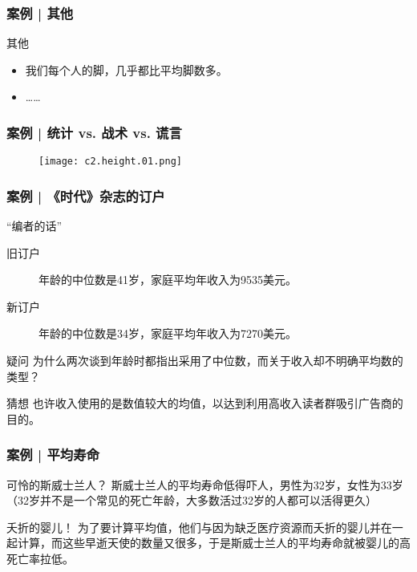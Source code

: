 \begin{frame}
  \frametitle{案例 | 其他}
  \begin{block}{其他}
    \begin{itemize}
      \item 我们每个人的脚，几乎都比平均脚数多。
      \item ……
    \end{itemize}
  \end{block}
\end{frame}

\begin{frame}
  \frametitle{案例 | 统计 vs. 战术 vs. 谎言}
  \begin{figure}
    \centering
    \texttt{[image: c2.height.01.png]}
  \end{figure}
\end{frame}

\begin{frame}
  \frametitle{案例 | 《时代》杂志的订户}
  \begin{block}{“编者的话”}
    \begin{description}
      \item[旧订户] 年龄的中位数是41岁，家庭平均年收入为9535美元。
      \item[新订户] 年龄的中位数是34岁，家庭平均年收入为7270美元。
    \end{description}
  \end{block}
  \pause
  \begin{block}{疑问}
    为什么两次谈到年龄时都指出采用了中位数，而关于收入却不明确平均数的类型？
  \end{block}
  \pause
  \begin{block}{猜想}
    也许收入使用的是数值较大的均值，以达到利用高收入读者群吸引广告商的目的。
  \end{block}
\end{frame}

\begin{frame}
  \frametitle{案例 | 平均寿命}
  \begin{block}{可怜的斯威士兰人？}
    斯威士兰人的平均寿命低得吓人，男性为32岁，女性为33岁（32岁并不是一个常见的死亡年龄，大多数活过32岁的人都可以活得更久）
  \end{block}
  \pause \pause \pause \pause
  \begin{block}{夭折的婴儿！}
    为了要计算平均值，他们与因为缺乏医疗资源而夭折的婴儿并在一起计算，而这些早逝天使的数量又很多，于是斯威士兰人的平均寿命就被婴儿的高死亡率拉低。
  \end{block}
\end{frame}

